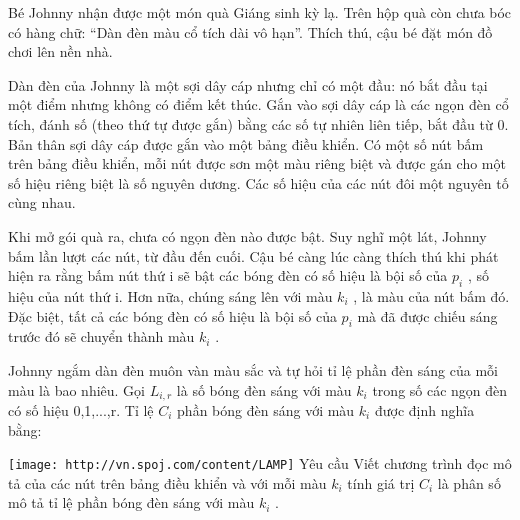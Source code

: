 Bé Johnny nhận được một món quà Giáng sinh kỳ lạ. Trên hộp quà còn chưa bóc có hàng chữ: “Dàn đèn màu cổ tích dài vô hạn”. Thích thú, cậu bé đặt món đồ chơi lên nền nhà.  

   Dàn đèn của Johnny là một sợi dây cáp nhưng chỉ có một đầu: nó bắt đầu tại một điểm nhưng không có điểm kết thúc. Gắn vào sợi dây cáp là các ngọn đèn cổ tích, đánh số (theo thứ tự được gắn) bằng các số tự nhiên liên tiếp, bắt đầu từ 0. Bản thân sợi dây cáp được gắn vào một bảng điều khiển. Có một số nút bấm trên bảng điều khiển, mỗi nút được sơn một màu riêng biệt và được gán cho một số hiệu  riêng biệt là số nguyên dương. Các số hiệu của các nút đôi một nguyên tố cùng nhau.  

   Khi mở gói quà ra, chưa có ngọn đèn nào được bật. Suy nghĩ một lát, Johnny bấm lần lượt các nút, từ đầu đến cuối. Cậu bé càng lúc càng thích thú khi phát hiện ra rằng bấm nút thứ i sẽ bật các bóng đèn có số hiệu là bội số của $p_{i}$   , số hiệu của nút thứ i. Hơn nữa, chúng sáng lên với màu $k_{i}$   , là màu của nút bấm đó. Đặc biệt, tất cả các bóng đèn có số hiệu là bội số của $p_{i}$   mà đã được chiếu sáng trước đó sẽ chuyển thành màu $k_{i}$   .  

   Johnny ngắm dàn đèn muôn vàn màu sắc và tự hỏi tỉ lệ phần đèn sáng của mỗi màu là bao nhiêu. Gọi $L_{i,r}$   là số bóng đèn sáng với màu $k_{i}$   trong số các ngọn đèn có số hiệu 0,1,...,r. Tỉ lệ $C_{i}$   phần bóng đèn sáng với màu $k_{i}$   được định nghĩa bằng:  


\texttt{[image: http://vn.spoj.com/content/LAMP]}
Yêu cầu
Viết chương trình đọc mô tả của các nút trên bảng điều khiển và với mỗi màu $k_{i}$   tính giá trị $C_{i}$   là phân số mô tả tỉ lệ phần bóng đèn sáng với màu $k_{i}$   .